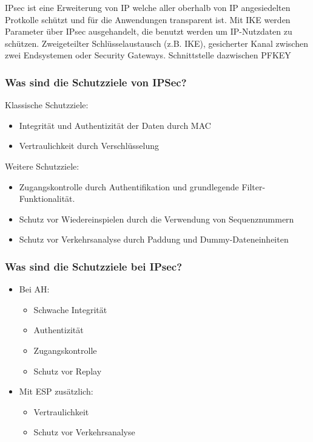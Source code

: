 	IPsec ist eine Erweiterung von IP welche aller oberhalb von IP angesiedelten Protkolle schützt und für die Anwendungen transparent ist. Mit IKE werden Parameter über IPsec ausgehandelt, die benutzt werden um IP-Nutzdaten zu schützen.
Zweigeteilter Schlüsselaustausch (z.B. IKE), gesicherter Kanal zwischen zwei Endsystemen oder Security Gateways. Schnittstelle dazwischen PF\textunderscore KEY %
	
	\subsubsection{Was sind die Schutzziele von IPSec?}
	Klassische Schutzziele:
	\begin{itemize}
		\item Integrität und Authentizität der Daten durch MAC
		\item Vertraulichkeit durch Verschlüsselung
	\end{itemize}
	Weitere Schutzziele:
	\begin{itemize}
		\item Zugangskontrolle durch Authentifikation und grundlegende Filter-Funktionalität.
		\item Schutz vor Wiedereinspielen durch die Verwendung von Sequenznummern
		\item Schutz vor Verkehrsanalyse durch Paddung und Dummy-Dateneinheiten
	\end{itemize}
	
		\subsubsection{Was sind die Schutzziele bei IPsec?}
	\begin{itemize}
		\item Bei AH: 
			\begin{itemize}
				\item Schwache Integrität %
				\item Authentizität
				\item Zugangskontrolle
				\item Schutz vor Replay
			\end{itemize}
		\item Mit ESP zusätzlich:
			\begin{itemize}
				\item Vertraulichkeit
				\item Schutz vor Verkehrsanalyse
			\end{itemize}
	\end{itemize}
	
